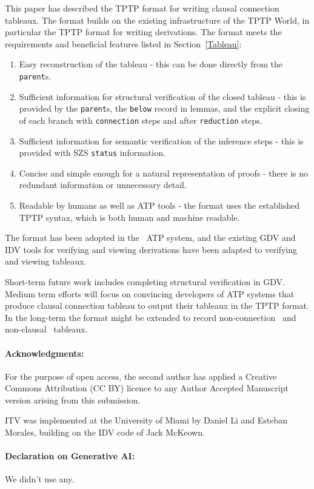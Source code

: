 \documentclass{ceurart}
\newcommand{\smalltt}[1]{\small \texttt{#1}}
\newenvironment{packed_itemize}{
\vspace*{-0.3em}
\begin{itemize}
\setlength{\partopsep}{0pt}
\setlength{\itemsep}{1pt}
\setlength{\parskip}{0pt}
\setlength{\parsep}{0pt}
}{\end{itemize}}
\begin{document}
This paper has described the TPTP format for writing clausal connection tableaux. 
The format builds on the existing infrastructure of the TPTP World, in particular the TPTP 
format for writing derivations.
The format meets the requirements and beneficial features listed in Section~\ref{Tableau}:
\begin{enumerate}
\item Easy reconstruction of the tableau - this can be done directly from the \smalltt{parent}s.
\item Sufficient information for structural verification of the closed tableau - this is provided
      by the \smalltt{parent}s, the \smalltt{below} record in lemmas, and the explicit closing of
      each branch with {\tt connection} steps and after {\tt reduction} steps.
\item Sufficient information for semantic verification of the inference steps - this is provided
      with SZS \smalltt{status} information.
\item Concise and simple enough for a natural representation of proofs - there is no redundant
      information or unnecessary detail.
\item Readable by humans as well as ATP tools - the format uses the established TPTP syntax, which
      is both human and machine readable.
\end{enumerate}
The format has been adopted in the \cpp\ ATP system, and the existing GDV and IDV tools for 
verifying and viewing derivations have been adapted to verifying and viewing tableaux.

Short-term future work includes completing structural verification in GDV. 
Medium term efforts will focus on convincing developers of ATP systems that produce clausal 
connection tableau to output their tableaux in the TPTP format.
In the long-term the format might be extended to record non-connection~\cite{FB+98,Hah01} and 
non-clausal~\cite{Ott11,Ott17} tableaux.

\vspace*{1em}
\noindent
\begin{minipage}{\textwidth}
\paragraph{Acknowledgments:}
\begin{packed_itemize}
\item For the purpose of open access, the second author has applied a Creative Commons Attribution 
      (CC BY) licence to any Author Accepted Manuscript version arising from this submission.
\item ITV was implemented at the University of Miami by Daniel Li and Esteban Morales, building
      on the IDV code of Jack McKeown.
\end{packed_itemize}

\paragraph{Declaration on Generative AI:}
We didn't use any.
\end{minipage}

% 

\end{document}
